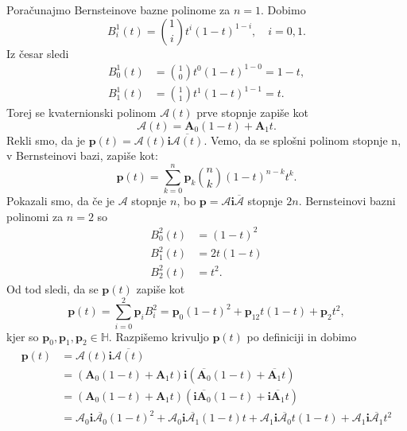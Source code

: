 \documentclass[mat1]{fmfdelo}
\newcommand{\HH}{\mathbb H}
\newcommand{\ii}{\boldsymbol i}
\newcommand{\pp}{\boldsymbol p}
\newcommand{\A}{\mathcal A}
\begin{document}
\begin{primer}{\label{primer35}}Poračunajmo Bernsteinove bazne polinome za $n=1$. Dobimo
\begin{equation*}
B_i^1(t) = \binom{1}{i} t^i(1-t)^{1-i}, \quad i= 0,1.
\end{equation*}
Iz česar sledi
\begin{equation*}
	\begin{split}
	B_0^1(t) &= \binom{1}{0} t^0(1-t)^{1-0} = 1-t, \\
	B_1^1(t) &= \binom{1}{1} t^1(1-t)^{1-1} = t.
	\end{split}
\end{equation*}
Torej se kvaternionski polinom $\A(t)$ prve stopnje zapiše kot
\begin{equation*}
\A(t) = \boldsymbol{A}_0(1-t) + \boldsymbol{A}_1t.
\end{equation*} 
Rekli smo, da je $\pp(t) = \A(t) \ii \overline{\A(t)}$. Vemo, da se splošni polinom stopnje n, v Bernsteinovi bazi, zapiše kot:
\begin{equation*}
\pp(t) = \sum_{k=0}^n \pp_k \binom{n}{k}(1-t)^{n-k}t^k.
\end{equation*}
Pokazali smo, da če je $\A$ stopnje $n$, bo $\pp = \A\ii\overline{\A}$ stopnje $2n$. Bernsteinovi bazni polinomi za $n=2$ so
\begin{equation*}
\begin{split}
B_0^2(t)& = (1-t)^2\\
B_1^2(t) &= 2t(1-t)\\
B_2^2(t) &= t^2.
\end{split}
\end{equation*}
Od tod sledi, da se $\pp(t)$ zapiše kot
\begin{equation*}
	\pp(t) = \sum_{i=0}^2 \pp_i B_i^2 = \pp_0 (1-t)^2 + \pp_12t(1-t) + \pp_2t^2,
\end{equation*}
kjer so $\pp_0,\pp_1,\pp_2 \in \HH$.
Razpišemo krivuljo $\pp(t)$ po definiciji in dobimo
\begin{equation*}
\begin{split}
\pp(t) &= \A(t)\ii\overline{\A(t)} \\
&= (\boldsymbol{A}_0(1-t) + \boldsymbol{A}_1t) \ii ( \overline{\boldsymbol{A}_0}(1-t) + \overline{\boldsymbol{A}_1}t) \\
& = (\boldsymbol{A}_0(1-t) + \boldsymbol{A}_1t) (\ii\overline{\boldsymbol{A}_0}(1-t) + \ii\overline{\boldsymbol{A}_1}t) \\
&=\A_0 \ii \overline{\A_0} (1-t)^2 + \A_0\ii\overline{\A_1}(1-t)t + \A_1\ii\overline{\A_0}t(1-t) + \A_1\ii\overline{\A_1}t^2 \\

\end{split}
\end{equation*}
\end{primer}
\end{document}
